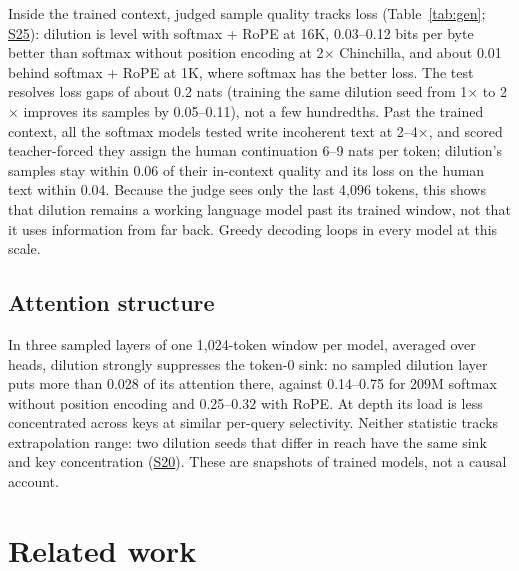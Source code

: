 \documentclass[11pt]{article}
\newcommand{\ledger}[1]{\href{https://github.com/Royer-Research-Labs/Dilution-Attention/blob/main/docs/signals.md}{#1}}
\begin{document}
Inside the trained context, judged sample quality tracks loss (Table~\ref{tab:gen}; \ledger{S25}):
dilution is level with softmax + RoPE at 16K, 0.03--0.12 bits per byte better than softmax without
position encoding at 2$\times$ Chinchilla, and about 0.01 behind softmax + RoPE at 1K, where softmax has
the better loss. The test resolves loss gaps of about 0.2 nats (training the same dilution seed from
1$\times$ to 2$\times$ improves its samples by 0.05--0.11), not a few hundredths. Past the trained context,
all the softmax models tested write incoherent text at 2--4$\times$, and scored teacher-forced they
assign the human continuation 6--9 nats per token; dilution's samples stay within 0.06 of their
in-context quality and its loss on the human text within 0.04. Because the judge sees only the last
4,096 tokens, this shows that dilution remains a working language model past its trained window, not
that it uses information from far back. Greedy decoding loops in every model at this scale.

\subsection{Attention structure}

In three sampled layers of one 1,024-token window per model, averaged over heads, dilution strongly
suppresses the token-0 sink: no sampled dilution layer puts more than 0.028 of its attention there,
against 0.14--0.75 for 209M softmax without position encoding and 0.25--0.32 with RoPE. At depth its
load is less concentrated across keys at similar per-query selectivity. Neither statistic tracks
extrapolation range: two dilution seeds that differ in reach have the same sink and key concentration
(\ledger{S20}). These are snapshots of trained models, not a causal account.

\section{Related work}
\end{document}
